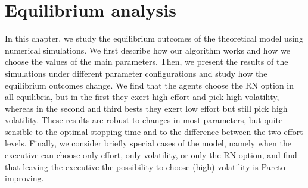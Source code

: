 \section{Equilibrium analysis}
In this chapter, we study the equilibrium outcomes of the theoretical model using numerical simulations. We first describe how our algorithm works and how we choose the values of the main parameters. Then, we present the results of the simulations under different parameter configurations and study how the equilibrium outcomes change. We find that the agents choose the RN option in all equilibria, but in the first they exert high effort and pick high volatility, whereas in the second and third bests they exert low effort but still pick high volatility. These results are robust to changes in most parameters, but quite sensible to the optimal stopping time and to the difference between the two effort levels. Finally, we consider briefly special cases of the model, namely when the executive can choose only effort, only volatility, or only the RN option, and find that leaving the executive the possibility to choose (high) volatility is Pareto improving.


